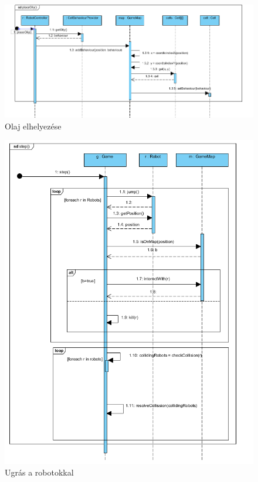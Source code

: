 \begin{figure}[!htbp]
	\begin{center}
		\includegraphics[width=180mm, center]{./chapters/chapter03/oily.png}
		\caption{Olaj elhelyezése}
	\end{center}
\end{figure}

\begin{figure}[!htbp]
	\begin{center}
		\includegraphics[width=\textwidth, center]{./chapters/chapter03/step.png}
		\caption{Ugrás a robotokkal}
	\end{center}
\end{figure}

